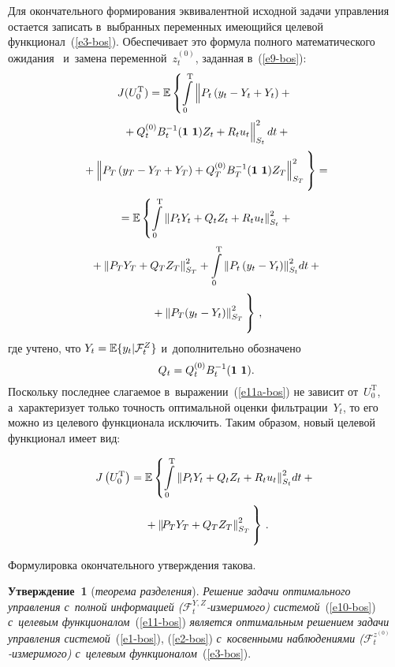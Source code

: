 \begin{multicols}{2}
     Для окончательного формирования эквивалентной исходной задачи 
управления остается записать в~выбранных переменных имеющийся целевой 
функционал~(\ref{e3-bos}). Обеспечивает это формула полного 
математического ожидания~\cite{15-bos} и~замена переменной~$z_t^{(0)}$, 
заданная в~(\ref{e9-bos}):
     \begin{multline}
     J(U_0^{\mathrm{T}}) =\mathbb{E}\left\{ \int\limits_0^{\mathrm{T}}
     \left\|
     \vphantom{B_t^{-1}Q_t^{(0)}}
      P_t\left(y_t -Y_t +Y_t\right) 
+{}\right.\right.\\[2pt]
\left.{}+Q_t^{(0)} B_t^{-1} (\mathbf{1}\ \mathbf{1})Z_t +R_t u_t \right\|^2_{S_t}dt+{}\\[2pt]
\left.{}+
     \left\| P_T\left(y_T -Y_T+Y_T\right) + Q_T^{(0)} B_T^{-1} (\mathbf{1}\ 
\mathbf{1})Z_T\right\|^2_{S_T}
\vphantom{\int\limits_0^t}
\right\}= {}\\[2pt]
     {}=
     \mathbb{E} \left\{ \int\limits_0^{\mathrm{T}} \left\|  P_t Y_t +Q_t Z_t +R_t 
u_t \right\|^2_{S_t} +{}\right.\\[2pt]
{}+\left\| P_T Y_T +Q_T Z_T \right\|^2_{S_T} + 
\int\limits_0^{\mathrm{T}} \left\| P_t \left(y_t-Y_t\right)\right\|^2_{S_t}\!dt+{}\\[2pt]
\left.{}+\left\| P_T(y_t-
Y_t)\right\|^2_{S_T}
\vphantom{\int\limits_0^t}
\right\}\,,
\label{e11a-bos}
     \end{multline}
где учтено, что $Y_t\hm= \mathbb{E}\{ y_t\vert \mathcal{F}_t^Z\}$ 
и~дополнительно обозначено 
$$
Q_t\hm= Q_t^{(0)} B_t^{-1}(\mathbf{1}\  
\mathbf{1}).
$$
 Поскольку последнее слагаемое в~выражении~(\ref{e11a-bos})  
не зависит от~$U_0^{\mathrm{T}}$, а~характеризует только точ\-ность оптимальной 
оценки фильтрации~$Y_t$, то его можно из целевого функционала 
исключить. Таким образом, новый целевой функционал имеет вид:

\noindent
\begin{multline}
J\left(U_0^{\mathrm{T}}\right)=\mathbb{E}\left\{ \int\limits_0^{\mathrm{T}} \left\| P_t Y_t +Q_t Z_t 
+R_tu_t\right\|^2_{S_t}\!dt +{}\right.\\[2pt]
\left.{}+\left\| \!P_T 
Y_T+Q_TZ_T\right\|^2_{S_T}
\vphantom{\int\limits_0^t}
\right\}\,.
\label{e11-bos}
\end{multline}
     
     Формулировка окончательного утверждения такова.
     
     \smallskip
     
     \noindent
     \textbf{Утверждение~1} (\textit{теорема разделения}). \textit{Решение 
задачи оптимального управления с~полной информацией  
($\mathcal{F}_t^{Y,Z}$-из\-ме\-ри\-мо\-го) системой}~(\ref{e10-bos}) 
\textit{с~целевым функционалом}~(\ref{e11-bos}) \textit{является 
оптимальным решением задачи управления системой}~(\ref{e1-bos}), 
(\ref{e2-bos}) \textit{с~косвенными наблюдениями 
($\mathcal{F}_t^{z^{(0)}}$-из\-ме\-ри\-мо\-го) с~целевым 
функ\-цио\-на\-лом}~(\ref{e3-bos}).
{\looseness=1

}
\end{multicols}
